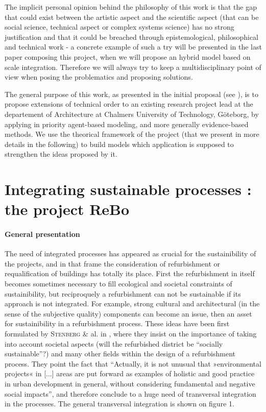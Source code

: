 \documentclass[english]{article}
\newcommand{\noun}[1]{\textsc{#1}}
\begin{document}
\bigskip{}


The implicit personal opinion behind the philosophy of this work is
that the gap that could exist between the artistic aspect and the
scientific aspect (that can be social science, technical aspect or
complex systems science) has no strong justification and that it could
be breached through epistemological, philosophical and technical work
- a concrete example of such a try will be presented in the last paper
composing this project, when we will propose an hybrid model based
on scale integration. Therefore we will always try to keep a multidisciplinary
point of view when posing the problematics and proposing solutions.

\bigskip{}


The general purpose of this work, as presented in the initial proposal
(see \cite{RaimbaultReBoDescription0412}), is to propose extensions
of technical order to an existing research project lead at the departement
of Architecture at Chalmers University of Technology, Göteborg, by
applying in priority agent-based modeling, and more generally evidence-based
methods. We use the theorical framework of the project (that we present
in more details in the following) to build models which application
is supposed to strengthen the ideas proposed by it.


\section{Integrating sustainable processes : the project ReBo}


\paragraph{General presentation}

The need of integrated processes has appeared as crucial for the sustainibility
of the projects, and in that frame the consideration of refurbishment
or requalification of buildings has totally its place. First the refurbishment
in itself becomes sometimes necessary to fill ecological and societal
constraints of sustainibility, but reciproquely a refurbishment can
not be sustainable if its approach is not integrated. For example,
strong cultural and architectural (in the sense of the subjective
quality) components can become an issue, then an asset for sustainibility
in a refurbishment process. These ideas have been first formulated
by \noun{Stenberg} \& al. in \cite{stenberg2009linking}, where they
insist on the importance of taking into account societal aspects (will
the refurbished district be ``socially sustainable''?) and many
other fields within the design of a refurbishment process. They point
the fact that ``Actually, it is not unusual that »environmental projects«
in {[}...{]} areas are put forward as examples of holistic and good
practice in urban development in general, without considering fundamental
and negative social impacts'', and therefore conclude to a huge need
of transversal integration in the processes. The general transversal
integration is shown on figure 1.
\end{document}
